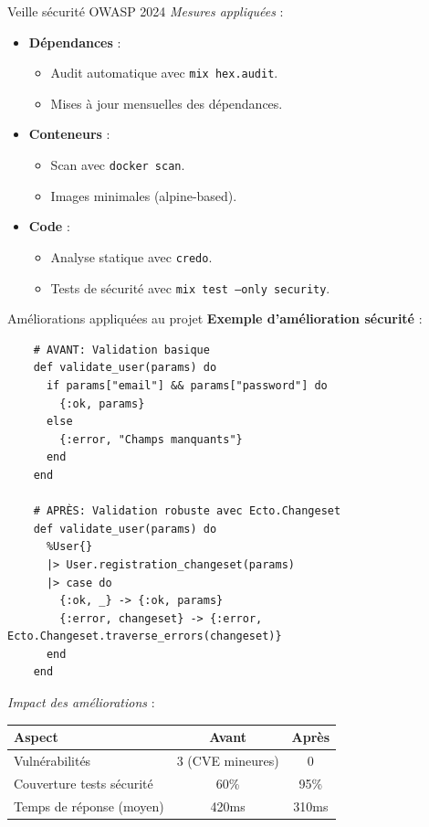 \begin{for_you}{Veille sécurité OWASP 2024}
    \textit{Mesures appliquées} :
    \begin{itemize}
        \item \textbf{Dépendances} :
              \begin{itemize}
                  \item Audit automatique avec \texttt{mix hex.audit}.
                  \item Mises à jour mensuelles des dépendances.
              \end{itemize}
        \item \textbf{Conteneurs} :
              \begin{itemize}
                  \item Scan avec \texttt{docker scan}.
                  \item Images minimales (alpine-based).
              \end{itemize}
        \item \textbf{Code} :
              \begin{itemize}
                  \item Analyse statique avec \texttt{credo}.
                  \item Tests de sécurité avec \texttt{mix test --only security}.
              \end{itemize}
    \end{itemize}
\end{for_you}

\begin{for_you}{Améliorations appliquées au projet}
    \textbf{Exemple d’amélioration sécurité} :
    \begin{lstlisting}
    # AVANT: Validation basique
    def validate_user(params) do
      if params["email"] && params["password"] do
        {:ok, params}
      else
        {:error, "Champs manquants"}
      end
    end

    # APRÈS: Validation robuste avec Ecto.Changeset
    def validate_user(params) do
      %User{}
      |> User.registration_changeset(params)
      |> case do
        {:ok, _} -> {:ok, params}
        {:error, changeset} -> {:error, Ecto.Changeset.traverse_errors(changeset)}
      end
    end
    \end{lstlisting}

    \textit{Impact des améliorations} :
    \begin{center}
    \begin{tabular}{|l|c|c|}
    \hline
    \textbf{Aspect} & \textbf{Avant} & \textbf{Après} \\
    \hline
    Vulnérabilités & 3 (CVE mineures) & 0 \\
    Couverture tests sécurité & 60\% & 95\% \\
    Temps de réponse (moyen) & 420ms & 310ms \\
    \hline
    \end{tabular}
    \end{center}
\end{for_you}

